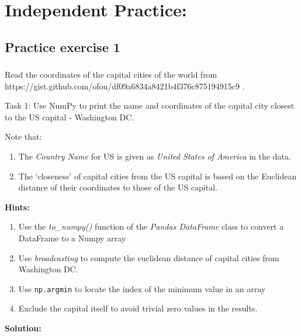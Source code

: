 \documentclass[
  letterpaper,
  DIV=11,
  numbers=noendperiod]{scrreprt}
\providecommand{\tightlist}{%
  \setlength{\itemsep}{0pt}\setlength{\parskip}{0pt}}\usepackage{longtable,booktabs,array}
\begin{document}
\hypertarget{independent-practice}{%
\section{Independent Practice:}\label{independent-practice}}

\hypertarget{practice-exercise-1-1}{%
\subsection{Practice exercise 1}\label{practice-exercise-1-1}}

\hypertarget{section-17}{%
\subsubsection{}\label{section-17}}

Read the coordinates of the capital cities of the world from
https://gist.github.com/ofou/df09a6834a8421b4f376c875194915c9 .

Task 1: Use NumPy to print the name and coordinates of the capital city
closest to the US capital - Washington DC.

Note that:

\begin{enumerate}
\def\labelenumi{\arabic{enumi}.}
\tightlist
\item
  The \emph{Country Name} for US is given as \emph{United States of
  America} in the data.
\item
  The `closeness' of capital cities from the US capital is based on the
  Euclidean distance of their coordinates to those of the US capital.
\end{enumerate}

\textbf{Hints:}

\begin{enumerate}
\def\labelenumi{\arabic{enumi}.}
\tightlist
\item
  Use the \emph{to\_numpy()} function of the \emph{Pandas DataFrame}
  class to convert a DataFrame to a Numpy array
\item
  Use \emph{broadcasting} to compute the euclidean distance of capital
  cities from Washington DC.
\item
  Use \texttt{np.argmin} to locate the index of the minimum value in an
  array
\item
  Exclude the capital itself to avoid trivial zero values in the
  results.
\end{enumerate}

\textbf{Solution:}
\end{document}
